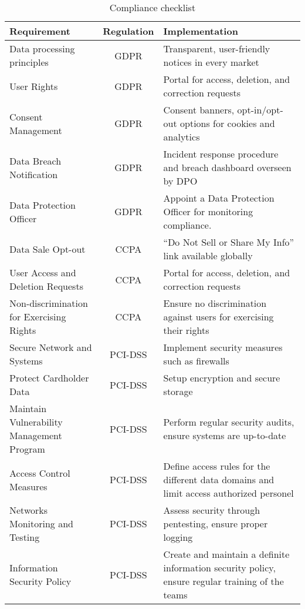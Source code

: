 \documentclass[11pt,a4paper,computermodern]{article}
\begin{document}
\begin{table}[h!]
	\centering
	\begin{threeparttable}
		\caption{Compliance checklist}
		\label{table:compliance}
		\begin{tabularx}{0.99\textwidth}{>{\centering\arraybackslash}X c >{\centering\arraybackslash}X}
			\toprule
			Requirement & Regulation & Implementation  \\
			\midrule
			Data processing principles & GDPR & Transparent, user-friendly notices in every market \\
			User Rights & GDPR & Portal for access, deletion, and correction requests \\
			Consent Management & GDPR &  Consent banners, opt-in/opt-out options for cookies and analytics \\
			Data Breach Notification & GDPR & Incident response procedure and breach dashboard overseen by DPO \\
			Data Protection Officer & GDPR & Appoint a Data Protection Officer for monitoring compliance. \\
			Data Sale Opt-out & CCPA & “Do Not Sell or Share My Info” link available globally \\
			User Access and Deletion Requests & CCPA & Portal for access, deletion, and correction requests \\
			Non-discrimination for Exercising Rights & CCPA & Ensure no discrimination against users for exercising their rights \\
			Secure Network and Systems & PCI-DSS & Implement security measures such as firewalls \\
			Protect Cardholder Data & PCI-DSS & Setup encryption and secure storage \\
			Maintain Vulnerability Management Program & PCI-DSS & Perform regular security audits, ensure systems are up-to-date \\
			Access Control Measures & PCI-DSS & Define access rules for the different data domains and limit access authorized personel \\
			Networks Monitoring and Testing & PCI-DSS & Assess security through pentesting, ensure proper logging \\
			Information Security Policy & PCI-DSS & Create and maintain a definite information security policy, ensure regular training of the teams \\
			\bottomrule
		\end{tabularx}
	\end{threeparttable}
\end{table}
\end{document}
